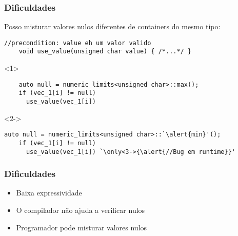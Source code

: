 \documentclass[t]{beamer}
\begin{document}
\begin{frame}[fragile]
  \frametitle{Dificuldades}
  Posso misturar valores nulos diferentes de containers do mesmo tipo:
  \begin{lstlisting}[escapeinside=`']
    //precondition: value eh um valor valido
    void use_value(unsigned char value) { /*...*/ }
  \end{lstlisting}

  \begin{onlyenv}<1>
  \begin{lstlisting}
    auto null = numeric_limits<unsigned char>::max();
    if (vec_1[i] != null)
      use_value(vec_1[i])
  \end{lstlisting}
  \end{onlyenv}

  \begin{onlyenv}<2->
  \begin{lstlisting}[escapeinside=`']
    auto null = numeric_limits<unsigned char>::`\alert{min}'();
    if (vec_1[i] != null)
      use_value(vec_1[i]) `\only<3->{\alert{//Bug em runtime}}'
  \end{lstlisting}
  \end{onlyenv}
\end{frame}

\begin{frame}[fragile]
  \frametitle{Dificuldades}
  \begin{itemize}
    \item<1->{Baixa expressividade}
    \item<2->{O compilador não ajuda a verificar nulos}
    \item<3->{Programador pode misturar valores nulos}
  \end{itemize}
\end{frame}
\end{document}
